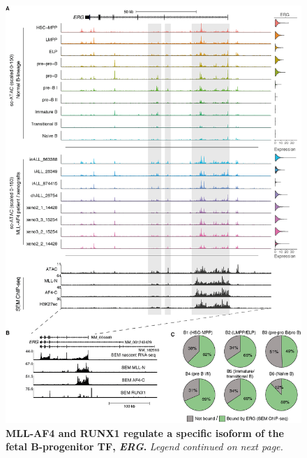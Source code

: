 \begin{figure}[p]
    \centering
    \includegraphics[width=\textwidth,height=\textheight,keepaspectratio]{figures/chapter4/ch4_multiome-erg.png}
    \caption[{MLL-AF4 and RUNX1 regulate a specific isoform of the fetal B-progenitor TF, \textit{ERG}.}]
    {\textbf{MLL-AF4 and RUNX1 regulate a specific isoform of the fetal B-progenitor TF, \textit{ERG}.} 
    \textit{Legend continued on next page.}
    }
    \label{fig:ch4_multiome-erg}
\end{figure}

